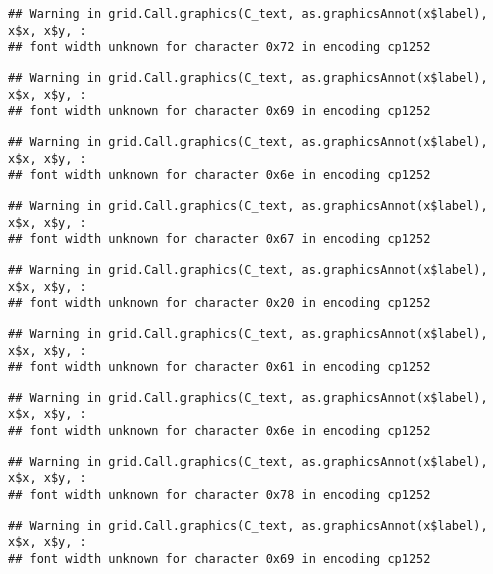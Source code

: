 \documentclass[
]{article}
\begin{document}
\begin{verbatim}
## Warning in grid.Call.graphics(C_text, as.graphicsAnnot(x$label), x$x, x$y, :
## font width unknown for character 0x72 in encoding cp1252
\end{verbatim}

\begin{verbatim}
## Warning in grid.Call.graphics(C_text, as.graphicsAnnot(x$label), x$x, x$y, :
## font width unknown for character 0x69 in encoding cp1252
\end{verbatim}

\begin{verbatim}
## Warning in grid.Call.graphics(C_text, as.graphicsAnnot(x$label), x$x, x$y, :
## font width unknown for character 0x6e in encoding cp1252
\end{verbatim}

\begin{verbatim}
## Warning in grid.Call.graphics(C_text, as.graphicsAnnot(x$label), x$x, x$y, :
## font width unknown for character 0x67 in encoding cp1252
\end{verbatim}

\begin{verbatim}
## Warning in grid.Call.graphics(C_text, as.graphicsAnnot(x$label), x$x, x$y, :
## font width unknown for character 0x20 in encoding cp1252
\end{verbatim}

\begin{verbatim}
## Warning in grid.Call.graphics(C_text, as.graphicsAnnot(x$label), x$x, x$y, :
## font width unknown for character 0x61 in encoding cp1252
\end{verbatim}

\begin{verbatim}
## Warning in grid.Call.graphics(C_text, as.graphicsAnnot(x$label), x$x, x$y, :
## font width unknown for character 0x6e in encoding cp1252
\end{verbatim}

\begin{verbatim}
## Warning in grid.Call.graphics(C_text, as.graphicsAnnot(x$label), x$x, x$y, :
## font width unknown for character 0x78 in encoding cp1252
\end{verbatim}

\begin{verbatim}
## Warning in grid.Call.graphics(C_text, as.graphicsAnnot(x$label), x$x, x$y, :
## font width unknown for character 0x69 in encoding cp1252
\end{verbatim}
\end{document}

